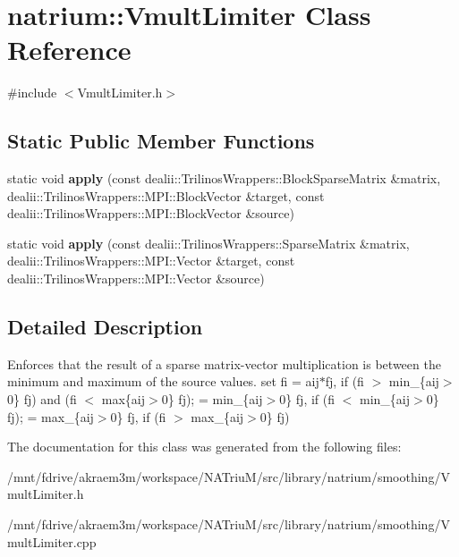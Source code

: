 \hypertarget{classnatrium_1_1VmultLimiter}{
\section{natrium::VmultLimiter Class Reference}
\label{classnatrium_1_1VmultLimiter}
}


{\ttfamily \#include $<$VmultLimiter.h$>$}\subsection*{Static Public Member Functions}
\begin{DoxyCompactItemize}
\item 
\hypertarget{classnatrium_1_1VmultLimiter_aef0bb4209b3c1e5a563027af56207485}{
static void {\bfseries apply} (const dealii::TrilinosWrappers::BlockSparseMatrix \&matrix, dealii::TrilinosWrappers::MPI::BlockVector \&target, const dealii::TrilinosWrappers::MPI::BlockVector \&source)}
\label{classnatrium_1_1VmultLimiter_aef0bb4209b3c1e5a563027af56207485}

\item 
\hypertarget{classnatrium_1_1VmultLimiter_a65036c5ebf9b0fd452b0723a3cbcb098}{
static void {\bfseries apply} (const dealii::TrilinosWrappers::SparseMatrix \&matrix, dealii::TrilinosWrappers::MPI::Vector \&target, const dealii::TrilinosWrappers::MPI::Vector \&source)}
\label{classnatrium_1_1VmultLimiter_a65036c5ebf9b0fd452b0723a3cbcb098}

\end{DoxyCompactItemize}


\subsection{Detailed Description}
Enforces that the result of a sparse matrix-\/vector multiplication is between the minimum and maximum of the source values. set fi = aij$\ast$fj, if (fi $>$ min\_\-\{aij$>$0\} fj) and (fi $<$ max\{aij$>$0\} fj); = min\_\-\{aij$>$0\} fj, if (fi $<$ min\_\-\{aij$>$0\} fj); = max\_\-\{aij$>$0\} fj, if (fi $>$ max\_\-\{aij$>$0\} fj) 

The documentation for this class was generated from the following files:\begin{DoxyCompactItemize}
\item 
/mnt/fdrive/akraem3m/workspace/NATriuM/src/library/natrium/smoothing/VmultLimiter.h\item 
/mnt/fdrive/akraem3m/workspace/NATriuM/src/library/natrium/smoothing/VmultLimiter.cpp\end{DoxyCompactItemize}
